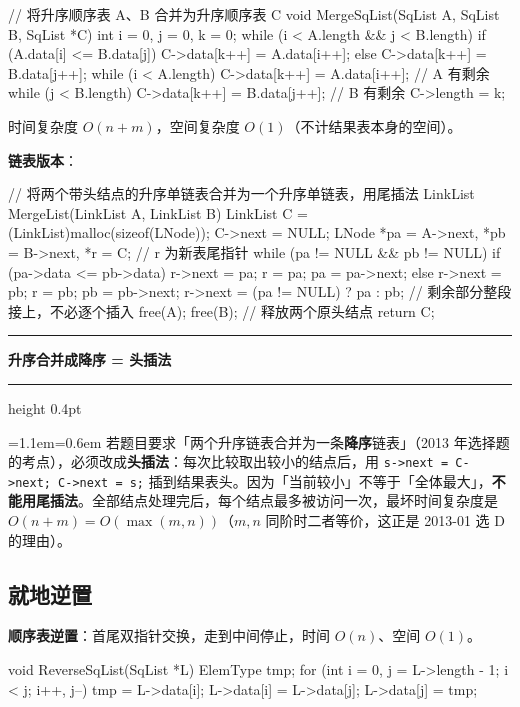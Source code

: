 \documentclass[11pt,openany,UTF8]{ctexbook}
\newcommand{\callouthead}[2]{%
  \par\addvspace{7pt}\noindent
  {\color{#1}\rule[-0.15em]{3pt}{1.05em}}\hspace{0.5em}%
  {\bfseries\color{#1}#2}\par\nobreak\vspace{-0.35em}%
  {\color{rulesep}\hrule height 0.4pt}\nobreak\vspace{0.45em}%
  \begingroup\small\setlength{\parindent}{0pt}%
  \leftskip=1.1em\rightskip=0.6em\noindent\ignorespaces}
\newcommand{\calloutend}{\par\endgroup\addvspace{7pt}}
\newenvironment{callkey}[1]{\callouthead{keybar}{#1}}{\calloutend}
\begin{document}
\begin{codebox}
// 将升序顺序表 A、B 合并为升序顺序表 C
void MergeSqList(SqList A, SqList B, SqList *C) {
    int i = 0, j = 0, k = 0;
    while (i < A.length && j < B.length) {
        if (A.data[i] <= B.data[j]) C->data[k++] = A.data[i++];
        else                        C->data[k++] = B.data[j++];
    }
    while (i < A.length) C->data[k++] = A.data[i++];  // A 有剩余
    while (j < B.length) C->data[k++] = B.data[j++];  // B 有剩余
    C->length = k;
}
\end{codebox}

时间复杂度 $O(n+m)$，空间复杂度 $O(1)$（不计结果表本身的空间）。

\textbf{链表版本}：

\begin{codebox}
// 将两个带头结点的升序单链表合并为一个升序单链表，用尾插法
LinkList MergeList(LinkList A, LinkList B) {
    LinkList C = (LinkList)malloc(sizeof(LNode));
    C->next = NULL;
    LNode *pa = A->next, *pb = B->next, *r = C;  // r 为新表尾指针
    while (pa != NULL && pb != NULL) {
        if (pa->data <= pb->data) { r->next = pa; r = pa; pa = pa->next; }
        else                     { r->next = pb; r = pb; pb = pb->next; }
    }
    r->next = (pa != NULL) ? pa : pb;   // 剩余部分整段接上，不必逐个插入
    free(A); free(B);                   // 释放两个原头结点
    return C;
}
\end{codebox}

\begin{callkey}{升序合并成降序 = 头插法}
若题目要求「两个升序链表合并为一条\textbf{降序}链表」（2013 年选择题的考点），必须改成\textbf{头插法}：每次比较取出较小的结点后，用 \texttt{s->\allowbreak{}next =\allowbreak{} C->\allowbreak{}next;\allowbreak{} C->\allowbreak{}next =\allowbreak{} s;\allowbreak{}} 插到结果表头。因为「当前较小」不等于「全体最大」，\textbf{不能用尾插法}。全部结点处理完后，每个结点最多被访问一次，最坏时间复杂度是 $O(n+m) = O(\max(m,n))$（$m,n$ 同阶时二者等价，这正是 2013-01 选 D 的理由）。

\end{callkey}

\subsection{就地逆置}

\textbf{顺序表逆置}：首尾双指针交换，走到中间停止，时间 $O(n)$、空间 $O(1)$。

\begin{codebox}
void ReverseSqList(SqList *L) {
    ElemType tmp;
    for (int i = 0, j = L->length - 1; i < j; i++, j--) {
        tmp = L->data[i]; L->data[i] = L->data[j]; L->data[j] = tmp;
    }
}
\end{codebox}
\end{document}
